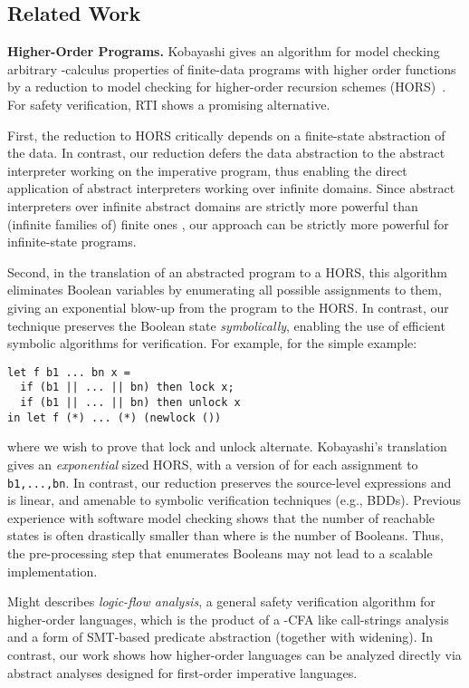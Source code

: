 \documentclass[nocopyrightspace]{sigplanconf}
\def\mypara#1{\smallskip\noindent\textbf{#1}}
\newcommand\HMC{\textsc{RTI}\xspace}
\begin{document}
{\subsection{Related Work}

\mypara{Higher-Order Programs.}
Kobayashi \cite{KobayashiPOPL09,KobayashiLICS09} gives an algorithm
for model checking arbitrary -calculus properties of finite-data
programs with higher order functions by a reduction to model checking
for higher-order recursion schemes (HORS)~\cite{Ong}.
For safety verification, \HMC shows a promising alternative.

First, the reduction to HORS critically depends on a finite-state abstraction of the data.
In contrast, our reduction defers the data abstraction to the abstract interpreter working
on the imperative program, thus enabling the direct application of abstract interpreters working
over infinite domains. 
Since abstract interpreters over infinite abstract domains are strictly 
more powerful than (infinite families of) finite ones \cite{CousotCousot92comparison}, 
our approach can be strictly more powerful for infinite-state programs.


Second, in the translation of an abstracted program to a HORS,
this algorithm eliminates Boolean variables by enumerating 
all possible assignments to them, giving an exponential
blow-up from the program to the HORS. 
In contrast, our technique preserves the Boolean state \emph{symbolically}, 
enabling the use of efficient symbolic algorithms for verification.
For example, for the simple example:
\begin{verbatim}
let f b1 ... bn x = 
  if (b1 || ... || bn) then lock x;
  if (b1 || ... || bn) then unlock x 
in let f (*) ... (*) (newlock ()) 
\end{verbatim}
where we wish to prove that lock and unlock alternate. 
Kobayashi's translation \cite{KobayashiPOPL09} gives an {\em exponential} sized HORS,
with a version of  for each assignment to \verb+b1,...,bn+.
In contrast, our reduction preserves the source-level expressions and is linear, 
and amenable to symbolic verification techniques (e.g., BDDs).
Previous experience with software model checking \cite{SLAMPOPL02,HJMM04,fsoft06} 
shows that the number of reachable states is often drastically 
smaller than  where  is the number of Booleans.  
Thus, the pre-processing step that enumerates Booleans 
may not lead to a scalable implementation.

Might \cite{Might07} describes {\em logic-flow analysis}, a general safety verification 
algorithm for higher-order languages, which is the product 
of a -CFA like call-strings analysis and a form of SMT-based
predicate abstraction (together with widening).
In contrast, our work shows how higher-order
languages can be analyzed directly via 
abstract analyses designed for first-order imperative languages.

}
\end{document}

